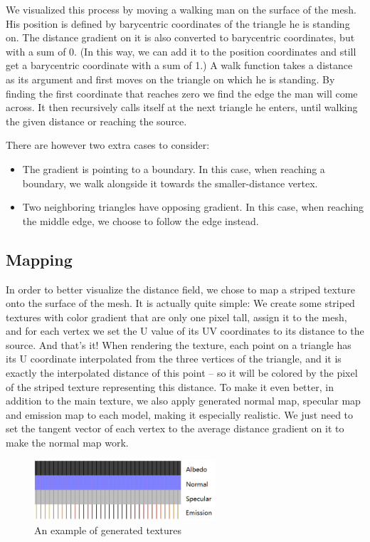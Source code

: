 \documentclass[a4paper,12pt,twoside]{article}
\begin{document}
We visualized this process by moving a walking man on the surface of the mesh. His position is defined by barycentric coordinates of the triangle he is standing on. The distance gradient on it is also converted to barycentric coordinates, but with a sum of 0. (In this way, we can add it to the position coordinates and still get a barycentric coordinate with a sum of 1.) A walk function takes a distance as its argument and first moves on the triangle on which he is standing. By finding the first coordinate that reaches zero we find the edge the man will come across. It then recursively calls itself at the next triangle he enters, until walking the given distance or reaching the source.


There are however two extra cases to consider:
\begin{itemize}
\item
The gradient is pointing to a boundary. In this case, when reaching a boundary, we walk alongside it towards the smaller-distance vertex.
\item
Two neighboring triangles have opposing gradient. In this case, when reaching the middle edge, we choose to follow the edge instead.
\end{itemize}

\subsection{Mapping}

In order to better visualize the distance field, we chose to map a striped texture onto the surface of the mesh. It is actually quite simple: We create some striped textures with color gradient that are only one pixel tall, assign it to the mesh, and for each vertex we set the U value of its UV coordinates to its distance to the source. And that’s it! When rendering the texture, each point on a triangle has its U coordinate interpolated from the three vertices of the triangle, and it is exactly the interpolated distance of this point – so it will be colored by the pixel of the striped texture representing this distance.
To make it even better, in addition to the main texture, we also apply generated normal map, specular map and emission map to each model, making it especially realistic. We just need to set the tangent vector of each vertex to the average distance gradient on it to make the normal map work.

\begin{figure}[htb]
	\centering
	\includegraphics[width=0.6\textwidth]{P9.png}
	\caption{An example of generated textures}
\end{figure}
\end{document}
